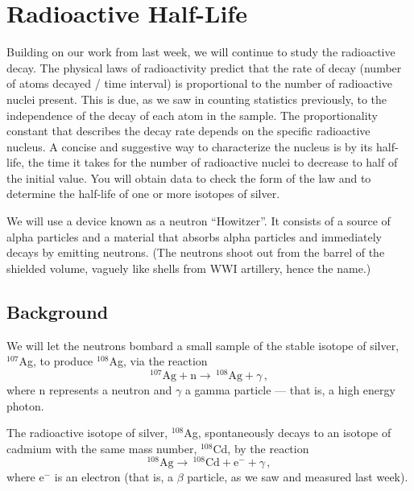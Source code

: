 \chapter{Radioactive Half-Life}


Building on our work from last week, we will continue to study the radioactive decay.
The physical laws of radioactivity predict that the rate of decay (number of atoms
decayed / time interval) is proportional to the number of radioactive nuclei present. This
is due, as we saw in counting statistics previously, to the independence of the decay of
each atom in the sample. The proportionality constant that describes the decay rate
depends on the specific radioactive nucleus. A concise and suggestive way to
characterize the nucleus is by its half-life, the time it takes for the number of radioactive
nuclei to decrease to half of the initial value. You will obtain data to check the form of
the law and to determine the half-life of one or more isotopes of silver.

We will use a device known as a neutron ``Howitzer''. It consists of a source of alpha
particles and a material that absorbs alpha particles and immediately decays by emitting
neutrons. (The neutrons shoot out from the barrel of the shielded volume, vaguely like
shells from WWI artillery, hence the name.)

\section{Background}

We will let the neutrons bombard a small sample of the stable isotope of silver, $^{107}$Ag, to
produce $^{108}$Ag, via the reaction
\begin{equation}
 ^{107}\textrm{Ag} + \mathrm{n} \rightarrow\, ^{108}\textrm{Ag} + \gamma \,,
\end{equation}
where $\mathrm{n}$ represents a neutron and $\gamma$ a gamma particle --- that is, a high energy photon.

The radioactive isotope of silver, $^{108}$Ag, spontaneously decays to an isotope of cadmium
with the same mass number, $^{108}$Cd, by the reaction
\begin{equation}
 ^{108}\textrm{Ag} \rightarrow\, ^{108}\textrm{Cd} + \mathrm{e}^- + \gamma \,,
\end{equation}
where $\mathrm{e}^-$ is an electron (that is, a $\beta$ particle, as we saw and measured last week).

